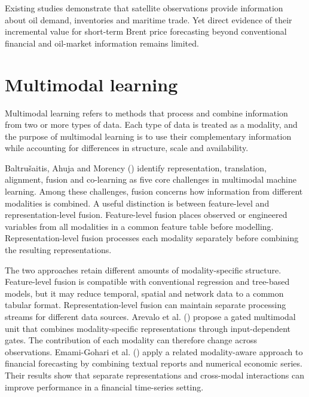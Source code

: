 \documentclass[
  british,
  12pt,
  oneside]{book}
\begin{document}
Existing studies demonstrate that satellite observations provide information about oil demand, inventories and maritime trade. Yet direct evidence of their incremental value for short-term Brent price forecasting beyond conventional financial and oil-market information remains limited.

\section{Multimodal learning}\label{lit-multimodal}

Multimodal learning refers to methods that process and combine information from two or more types of data. Each type of data is treated as a modality, and the purpose of multimodal learning is to use their complementary information while accounting for differences in structure, scale and availability.

Baltrušaitis, Ahuja and Morency () identify representation, translation, alignment, fusion and co-learning as five core challenges in multimodal machine learning. Among these challenges, fusion concerns how information from different modalities is combined. A useful distinction is between feature-level and representation-level fusion. Feature-level fusion places observed or engineered variables from all modalities in a common feature table before modelling. Representation-level fusion processes each modality separately before combining the resulting representations.

The two approaches retain different amounts of modality-specific structure. Feature-level fusion is compatible with conventional regression and tree-based models, but it may reduce temporal, spatial and network data to a common tabular format. Representation-level fusion can maintain separate processing streams for different data sources. Arevalo et al. () propose a gated multimodal unit that combines modality-specific representations through input-dependent gates. The contribution of each modality can therefore change across observations. Emami-Gohari et al. () apply a related modality-aware approach to financial forecasting by combining textual reports and numerical economic series. Their results show that separate representations and cross-modal interactions can improve performance in a financial time-series setting.
\end{document}
